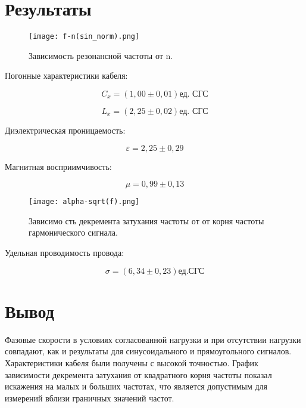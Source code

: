 \documentclass[a4paper, 12pt]{article}%
\begin{document}
\section*{Результаты}

\begin{figure}[H]
    \captionsetup{position=above, skip=2pt}
    \centering
    \caption{Зависимость резонансной частоты от n.}
    \texttt{[image: f-n(sin\_norm).png]}
\end{figure}

Погонные характеристики кабеля:

$$ C_x = (1,00 \pm 0,01) \text{ед. СГС} $$

$$ L_x = (2,25 \pm 0,02) \text{ед. СГС} $$

Диэлектрическая проницаемость:

$$ \varepsilon = 2,25 \pm 0,29 $$

Магнитная восприимчивость:

$$ \mu = 0,99 \pm 0,13 $$


\begin{figure}[H]
    \captionsetup{position=above, skip=2pt}
    \centering
    \caption{Зависимо
сть декремента затухания частоты от от корня частоты гармонического сигнала.}
    \texttt{[image: alpha-sqrt(f).png]}
\end{figure}

Удельная проводимость провода:

$$ \sigma = (6,34 \pm 0,23) \text{ед.СГС} $$

\section*{Вывод}

Фазовые скорости в условиях согласованной нагрузки и при отсутствии нагрузки совпадают, как и результаты для синусоидального и прямоугольного сигналов. Характеристики кабеля были получены с высокой точностью. График зависимости декремента затухания от квадратного корня частоты показал искажения на малых и больших частотах, что является допустимым для измерений вблизи граничных значений частот.
\end{document}
